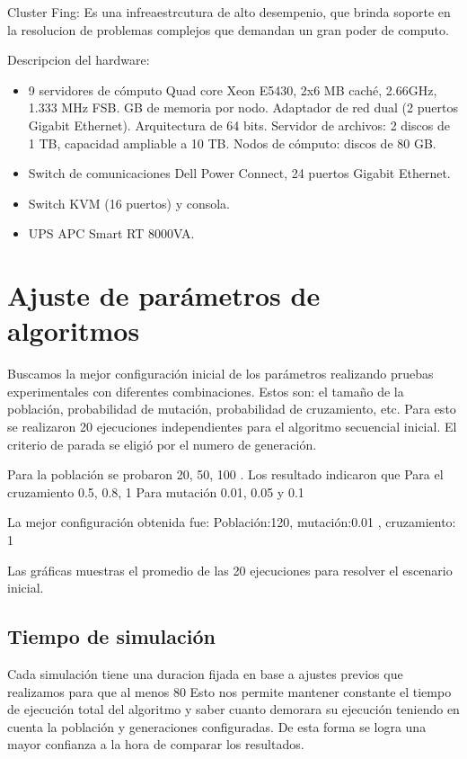 Cluster Fing: Es una infreaestrcutura de alto desempenio, que brinda soporte en la resolucion de problemas complejos que demandan un gran poder de computo.

Descripcion del hardware: 
\begin{itemize}
	\item 9 servidores de cómputo
	\subitem Quad core Xeon E5430, 2x6 MB caché, 2.66GHz, 1.333 MHz FSB.
	 GB de memoria por nodo.
	\subitem Adaptador de red dual (2 puertos Gigabit Ethernet).
	\subitem  Arquitectura de 64 bits.
	\subitem Servidor de archivos: 2 discos de 1 TB, capacidad ampliable a 10 TB.
	\subitem Nodos de cómputo: discos de 80 GB.
	\item Switch de comunicaciones
	\subitem Dell Power Connect, 24 puertos Gigabit Ethernet.
	\item Switch KVM (16 puertos) y consola.
	\item UPS APC Smart RT 8000VA.
\end{itemize}

\section{Ajuste de parámetros de algoritmos}
Buscamos la mejor configuración inicial de los parámetros realizando pruebas experimentales con diferentes combinaciones.  Estos son: el tamaño de la población,  probabilidad de mutación, probabilidad de cruzamiento, etc.
Para esto se realizaron 20 ejecuciones independientes para el algoritmo secuencial inicial.
El criterio de parada se eligió por el numero de generación.

Para la población se probaron 20, 50, 100 . Los resultado indicaron que 
Para el cruzamiento 0.5, 0.8, 1
Para mutación 0.01, 0.05 y 0.1

La mejor  configuración obtenida fue:
Población:120, mutación:0.01 , cruzamiento: 1

Las gráficas muestras el promedio de las 20 ejecuciones para resolver el escenario inicial.


\subsection{Tiempo de simulación}

Cada simulación tiene una duracion fijada en base a ajustes previos que realizamos para que al menos 80 %
Esto nos permite mantener constante el tiempo de ejecución total del algoritmo y saber cuanto demorara su ejecución teniendo en cuenta la población y generaciones configuradas. De esta forma se logra una mayor confianza a la hora de comparar los resultados.



